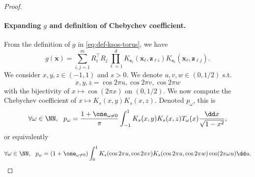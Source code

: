 \documentclass{article}
\begin{document}
\begin{proof}
  ~\paragraph{Expanding $g$ and definition of Chebychev coefficient.}
  From the definition of $g$ in \cref{eq:def-ksos-torus}, we have
  \begin{equation}\label{eq:cheby-coeff-psd-model-defmodel}
    g(\mathbf{x}) = \sum_{i, j = 1}^m R_i^\top R_j \prod_{\ell = 1}^d K_{\mathbf{s}_{\ell}} (\mathbf{x}_{\ell}, \mathbf{z}_{\ell i}) K_{\mathbf{s}_{\ell}} (\mathbf{x}_{\ell}, \mathbf{z}_{\ell j}).
  \end{equation}
  We consider $x, y, z \in (-1, 1)$ and $s > 0$. We denote $u, v, w \in (0, 1/2)$ s.t.
  \begin{equation*}
    x, y, z = \cos 2\pi u, \cos 2\pi v, \cos 2\pi w
  \end{equation*}
  with the bijectivity of $x \mapsto \cos(2\pi x)$ on $(0, 1/2)$. We now compute the Chebychev coefficient of $x \mapsto K_s(x, y) K_s(x, z)$. Denoted $p_\omega$, this is
  \begin{equation*}
    \forall \omega \in \NN, ~~ p_\omega = \frac{1 + \one_{\omega \neq 0}}{\pi} \int_{-1}^1 K_s(x, y) K_s(x, z) T_\omega(x) \frac{\dd x}{\sqrt{1 - x^2}},
  \end{equation*}
  or equivalently
  \begin{equation}\label{eq:cheby-coeff-psd-model-def}
    \forall \omega \in \NN, ~~ p_\omega = (1 + \one_{\omega \neq 0})\int_{0}^1 K_s(\cos 2\pi u, \cos 2\pi v) K_s(\cos 2\pi u, \cos 2\pi w) \cos (2\pi \omega u) \dd u.
  \end{equation}


\end{proof}
\end{document}
